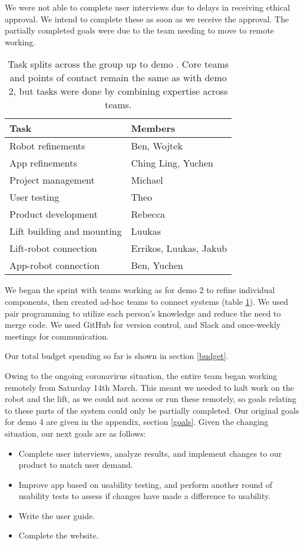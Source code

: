 \documentclass{article}
\begin{document}
We were not able to complete user interviews due to delays in receiving ethical approval. We intend to complete these as soon as we receive the approval. The partially completed goals were due to the team needing to move to remote working. 

\begin{table}[]
  \begin{tabular}{l|l}
    Task & Members \\
    \hline
    Robot refinements & Ben, Wojtek \\
    App refinements & Ching Ling, Yuchen \\
    Project management & Michael \\
    User testing & Theo \\
    Product development & Rebecca \\
    Lift building and mounting & Luukas \\
    Lift-robot connection & Errikos, Luukas, Jakub \\
    App-robot connection & Ben, Yuchen \\
  \end{tabular}
  \caption{Task splits across the group up to demo \demoNumber. Core teams and points of contact remain the same as with demo 2, but tasks were done by combining expertise across teams. }
  \label{tab:group-split}
\end{table}

We began the sprint with teams working as for demo 2 to refine individual components, then created ad-hoc teams to connect systems (table \ref{tab:group-split}). We used pair programming to utilize each person's knowledge and reduce the need to merge code. We used GitHub for version control, and Slack and once-weekly meetings for communication.

Our total budget spending so far is shown in section \ref{budget}.

Owing to the ongoing coronavirus situation, the entire team began working remotely from Saturday 14th March. This meant we needed to halt work on the robot and the lift, as we could not access or run these remotely, so goals relating to these parts of the system could only be partially completed. Our original goals for demo 4 are given in the appendix, section \ref{goals}. Given the changing situation, our next goals are as follows:
\begin{itemize}
  \item Complete user interviews, analyze results, and implement changes to our product to match user demand.
  \item Improve app based on usability testing, and perform another round of usability tests to assess if changes have made a difference to usability. 
  \item Write the user guide. 
  \item Complete the website. 
\end{itemize}
\end{document}
